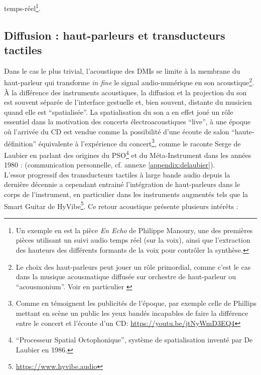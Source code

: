 temps-réel\footnote{Un exemple en est la pièce \textit{En Echo} de Philippe Manoury, une des premières pièces utilisant un suivi audio temps réel (sur la voix), ainsi que l'extraction des hauteurs des différents formants de la voix pour contrôler la synthèse.}.


\subsection{Diffusion : haut-parleurs et transducteurs tactiles}

\noindent Dans le cas le plus trivial, l'acoustique des \glspl{DMI} se limite à la membrane du haut-parleur qui transforme \textit{in fine} le signal audio-numérique en son acoustique\footnote{Le choix des haut-parleurs peut jouer un rôle primordial, comme c'est le cas dans la musique acousmatique diffusée sur orchestre de haut-parleur ou ``acousmonium''. Voir en particulier \cite{mooney_sound_2006}}. À la différence des instruments acoustiques, la diffusion et la projection du son est souvent séparée de l'interface gestuelle et, bien souvent, distante du musicien quand elle est ``spatialisée''. La spatialisation du son a en effet joué un rôle essentiel dans la motivation des concerts électroacoustiques ``live'', à une époque où l'arrivée du \gls{CD} est vendue comme la possibilité d'une écoute de salon ``haute-définition'' équivalente à l'expérience du concert\footnote{Comme en témoignent les publicités de l'époque, par exemple celle de Phillips mettant en scène un public les yeux bandés incapables de faire la différence entre le concert et l'écoute d'un \gls{CD}: \url{https://youtu.be/jtNyWmD3EQ4}}, comme le raconte Serge de Laubier en parlant des origines du PSO\footnote{``Processeur Spatial Octophonique'', système de spatialisation inventé par De Laubier en 1986.} et du Méta-Instrument dans les années 1980 :  (communication personnelle, cf. annexe \ref{appendix:delaubier}).\\
\indent L'essor progressif des transducteurs tactiles à large bande audio depuis la dernière décennie a cependant entrainé l'intégration de haut-parleurs dans le corps de l'instrument, en particulier dans les instruments augmentés tels que la Smart Guitar de HyVibe\footnote{\label{fn-hyvibe}\url{https://www.hyvibe.audio}}. Ce retour acoustique présente plusieurs intérêts :
